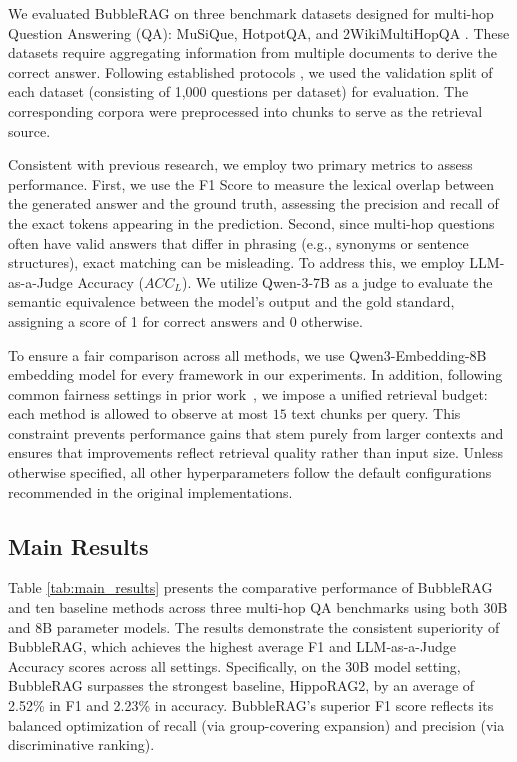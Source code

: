 We evaluated BubbleRAG on three benchmark datasets designed for multi-hop Question Answering (QA): MuSiQue\cite{2022-musique}, HotpotQA\cite{2018-hotpotqa}, and 2WikiMultiHopQA \cite{2020-multihopqa}. These datasets require aggregating information from multiple documents to derive the correct answer. Following established protocols \cite{2024-hipporag,2022-musique}, we used the validation split of each dataset (consisting of 1,000 questions per dataset) for evaluation. The corresponding corpora were preprocessed into chunks to serve as the retrieval source.

Consistent with previous research\cite{2024-hipporag,2025-cluerag}, we employ two primary metrics to assess performance. First, we use the F1 Score to measure the lexical overlap between the generated answer and the ground truth, assessing the precision and recall of the exact tokens appearing in the prediction. Second, since multi-hop questions often have valid answers that differ in phrasing (e.g., synonyms or sentence structures), exact matching can be misleading. To address this, we employ LLM-as-a-Judge Accuracy ($ACC_L$). We utilize Qwen-3-7B\cite{2025-qwen3} as a judge to evaluate the semantic equivalence between the model's output and the gold standard, assigning a score of 1 for correct answers and 0 otherwise.

To ensure a fair comparison across all methods, we use Qwen3-Embedding-8B\cite{2025-qwen3embedding} embedding model for every framework in our experiments. In addition, following common fairness settings in prior work~\cite{2025-cluerag}, we impose a unified retrieval budget: each method is allowed to observe at most $15$ text chunks per query. This constraint prevents performance gains that stem purely from larger contexts and ensures that improvements reflect retrieval quality rather than input size. Unless otherwise specified, all other hyperparameters follow the default configurations recommended in the original implementations.


\subsection{Main Results}

Table \ref{tab:main_results} presents the comparative performance of BubbleRAG and ten baseline methods across three multi-hop QA benchmarks using both 30B and 8B parameter models. The results demonstrate the consistent superiority of BubbleRAG, which achieves the highest average F1 and LLM-as-a-Judge Accuracy scores across all settings. Specifically, on the 30B model setting, BubbleRAG surpasses the strongest baseline, HippoRAG2, by an average of 2.52\% in F1 and 2.23\% in accuracy. BubbleRAG's superior F1 score reflects its balanced optimization of recall (via group-covering expansion) and precision (via discriminative ranking).

